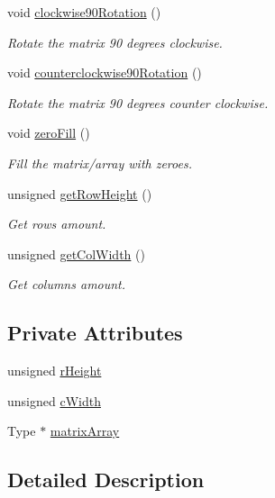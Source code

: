 \begin{DoxyCompactItemize}
void \hyperlink{classMatrix2D_a2845ff86d7f24ccd338b42b2a9cbe017}{clockwise90\+Rotation} ()
\begin{DoxyCompactList}\small\item\em Rotate the matrix 90 degrees clockwise. \end{DoxyCompactList}\item 
void \hyperlink{classMatrix2D_a3fc1bc77793995134f6d2a9095eb57cb}{counterclockwise90\+Rotation} ()
\begin{DoxyCompactList}\small\item\em Rotate the matrix 90 degrees counter clockwise. \end{DoxyCompactList}\item 
void \hyperlink{classMatrix2D_a64929341625696e9500aa9b6d51a8ae6}{zero\+Fill} ()
\begin{DoxyCompactList}\small\item\em Fill the matrix/array with zeroes. \end{DoxyCompactList}\item 
unsigned \hyperlink{classMatrix2D_acc55ef0f69af583aaefb8a484b4c2ca7}{get\+Row\+Height} ()
\begin{DoxyCompactList}\small\item\em Get rows amount. \end{DoxyCompactList}\item 
unsigned \hyperlink{classMatrix2D_afd2fbe10a27044f6e716242fde6a645a}{get\+Col\+Width} ()
\begin{DoxyCompactList}\small\item\em Get columns amount. \end{DoxyCompactList}\end{DoxyCompactItemize}
\subsection*{Private Attributes}
\begin{DoxyCompactItemize}
\item 
unsigned \hyperlink{classMatrix2D_afdcd47964719a1c4e006fbdd313d2f17}{r\+Height}
\item 
unsigned \hyperlink{classMatrix2D_ad30f0f3c259aaa26ddda2b4d17eddef2}{c\+Width}
\item 
Type $\ast$ \hyperlink{classMatrix2D_a6e702a96baba89ad29226ceb44676e2b}{matrix\+Array}
\end{DoxyCompactItemize}


\subsection{Detailed Description}
